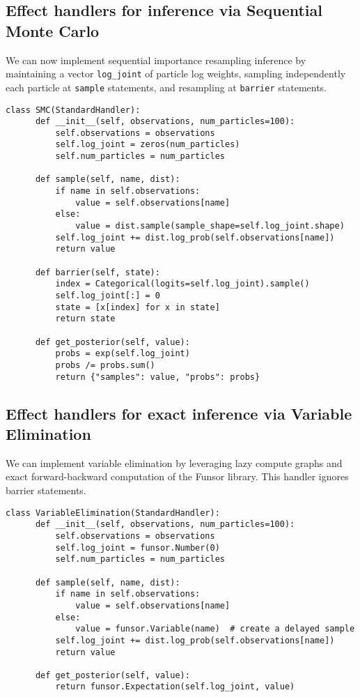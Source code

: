 \documentclass[anonymous=false, %
               format=acmsmall, %
               review=true, %
               screen=true, %
               nonacm=true]{acmart}
\begin{document}
\subsection{Effect handlers for inference via Sequential Monte Carlo}
\label{sec:appendix:smc}
We can now implement sequential importance resampling inference by maintaining a vector \verb$log_joint$ of particle log weights, sampling independently each particle at \verb$sample$ statements, and resampling at \verb$barrier$ statements.
\begin{Verbatim}[samepage=true]
  class SMC(StandardHandler):
      def __init__(self, observations, num_particles=100):
          self.observations = observations
          self.log_joint = zeros(num_particles)
          self.num_particles = num_particles
  
      def sample(self, name, dist):
          if name in self.observations:
              value = self.observations[name]
          else:
              value = dist.sample(sample_shape=self.log_joint.shape)
          self.log_joint += dist.log_prob(self.observations[name])
          return value
  
      def barrier(self, state):
          index = Categorical(logits=self.log_joint).sample()
          self.log_joint[:] = 0
          state = [x[index] for x in state]
          return state
  
      def get_posterior(self, value):
          probs = exp(self.log_joint)
          probs /= probs.sum()
          return {"samples": value, "probs": probs}
\end{Verbatim}

\subsection{Effect handlers for exact inference via Variable Elimination}
We can implement variable elimination by leveraging lazy compute graphs and exact forward-backward computation of the Funsor library.
This handler ignores barrier statements.
\label{sec:appendix:exact}
\begin{Verbatim}[samepage=true]
  class VariableElimination(StandardHandler):
      def __init__(self, observations, num_particles=100):
          self.observations = observations
          self.log_joint = funsor.Number(0)
          self.num_particles = num_particles

      def sample(self, name, dist):
          if name in self.observations:
              value = self.observations[name]
          else:
              value = funsor.Variable(name)  # create a delayed sample
          self.log_joint += dist.log_prob(self.observations[name])
          return value

      def get_posterior(self, value):
          return funsor.Expectation(self.log_joint, value)
\end{Verbatim}
\end{document}
